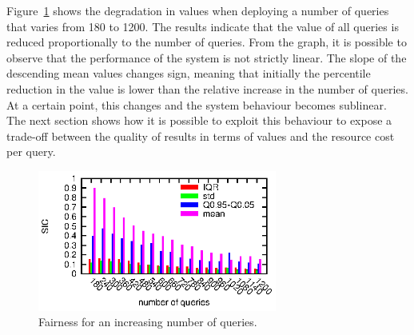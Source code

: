 Figure~\ref{fig:scalability:queries} shows the degradation in \sic values when deploying a
number of queries that varies from 180 to 1200. The results indicate that the value of all queries is
reduced proportionally to the number of queries. From the graph, it is possible to observe that the performance
of the system is not strictly linear. The slope of the descending mean \sic values changes sign, meaning
that initially the percentile reduction in the \sic value is lower than the relative increase in
the number of queries. At a certain point, this changes and the system behaviour becomes sublinear.
The next section shows how it is possible to exploit this behaviour to expose a trade-off between the
quality of results in terms of \sic values and the resource cost per query.
\begin{figure}[h!]
\centering
\includegraphics[width=0.7\textwidth]{img/tesi/queries_large}
\caption{Fairness for an increasing number of queries.}
\label{fig:scalability:queries}
\end{figure}



% 
%  

